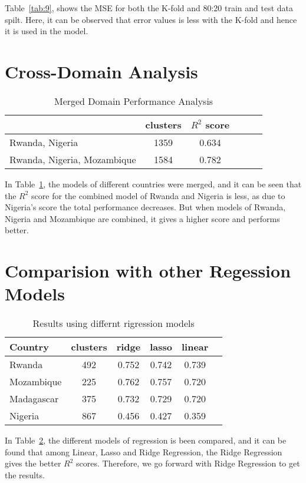 {Table~\ref{tab:9}}, shows the \ac{MSE} for both the K-fold and 80:20 train and test data spilt. Here, it can be observed that error values is less with the K-fold and hence it is used in the model.







\section{Cross-Domain Analysis}

\begin{table}[h!]
 \caption{Merged Domain Performance Analysis}
 \label{tab:7} 
\begin{center}
\begin{tabular}{|l|c|c|c|c|c|}
\hline
\hspace{1cm}{Merged Domain}   & clusters & \(R^2\) score   \\
\hline\hline
Rwanda, Nigeria  & 1359 & 0.634   \\
Rwanda, Nigeria, Mozambique  & 1584 & 0.782  \\
\hline\hline
 
\end{tabular}
\end{center}
\end{table}

In Table~\ref{tab:7}, the models of different countries were merged, and it can be seen that the \(R^2\) score for the combined model of Rwanda and Nigeria is less, as due to Nigeria's score the total performance decreases. But when models of Rwanda, Nigeria and Mozambique are combined, it gives a higher score and performs better.


\section{Comparision with other Regession Models}

\begin{table}[h!]
 \caption{Results using differnt rigression models}
 \label{tab:8} 
\begin{center}
\begin{tabular}{|l|c|c|c|c|c|}
\hline
Country & clusters & ridge & lasso & linear   \\
\hline\hline
Rwanda  & 492 & 0.752 & 0.742 & 0.739  \\
Mozambique & 225 & 0.762 & 0.757 & 0.720\\
Madagascar & 375 & 0.732 & 0.729 & 0.720\\
Nigeria & 867 & 0.456 & 0.427 & 0.359\\

\hline\hline
 
\end{tabular}
\end{center}
\end{table}
In Table~\ref{tab:8}, the different models of regression is been compared, and it can be found that among Linear, Lasso and Ridge Regression, the Ridge Regression gives the better \(R^2\) scores. Therefore, we go forward with Ridge Regression to get the results.

